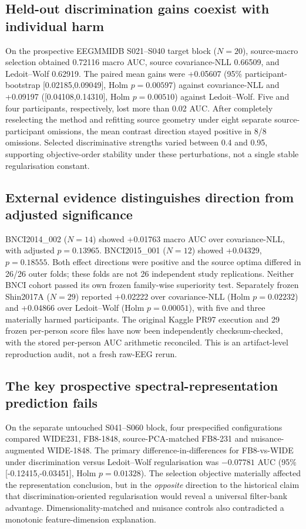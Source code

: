 \documentclass[11pt,a4paper]{article}
\begin{document}
\subsection{Held-out discrimination gains coexist with individual harm}
On the prospective EEGMMIDB S021--S040 target block (\(N=20\)),
source-macro selection obtained 0.72116 macro AUC, source
covariance-NLL 0.66509, and Ledoit--Wolf 0.62919.
The paired mean gains were +0.05607 (95\% participant-bootstrap
[0.02185,0.09049], Holm \(p=0.00597\)) against covariance-NLL and
+0.09197 ([0.04108,0.14310], Holm \(p=0.00510\)) against
Ledoit--Wolf. Five and four participants, respectively, lost more
than 0.02 AUC. After completely reselecting the method and refitting
source geometry under eight separate source-participant omissions,
the mean contrast direction stayed positive in 8/8 omissions.
Selected discriminative strengths varied between 0.4 and 0.95,
supporting objective-order stability under these perturbations,
not a single stable regularisation constant.

\subsection{External evidence distinguishes direction from adjusted significance}
BNCI2014\_002 (\(N=14\)) showed +0.01763 macro AUC over
covariance-NLL, with adjusted \(p=0.13965\).
BNCI2015\_001 (\(N=12\)) showed +0.04329, \(p=0.18555\).
Both effect directions were positive and the source optima differed in
26/26 outer folds; these folds are not 26 independent study replications.
Neither BNCI cohort passed its own frozen family-wise superiority test.
Separately frozen Shin2017A (\(N=29\)) reported +0.02222 over
covariance-NLL (Holm \(p=0.02232\)) and +0.04866 over Ledoit--Wolf
(Holm \(p=0.00051\)), with five and three materially harmed
participants. The original Kaggle PR97 execution and 29 frozen per-person
score files have now been independently checksum-checked, with
the stored per-person AUC arithmetic reconciled. This is
an artifact-level reproduction audit, not a fresh raw-EEG rerun.




\subsection{The key prospective spectral-representation prediction fails}
On the separate untouched S041--S060 block, four prespecified
configurations compared WIDE231, FB8-1848, source-PCA-matched
FB8-231 and nuisance-augmented WIDE-1848. The primary
difference-in-differences for FB8-vs-WIDE under discrimination versus
Ledoit--Wolf regularisation was \(-0.07781\) AUC
(95\% [-0.12415,-0.03451], Holm \(p=0.01328\)).
The selection objective materially affected the representation
conclusion, but in the \emph{opposite} direction to the historical
claim that discrimination-oriented regularisation would reveal a
universal filter-bank advantage. Dimensionality-matched and nuisance
controls also contradicted a monotonic feature-dimension explanation.
\end{document}
